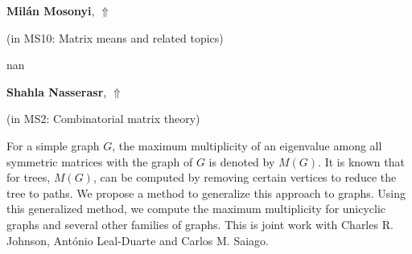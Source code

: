 \documentclass[ILAS2025-program.tex]{subfiles}
\begin{document}
\hypertarget{down0253}{}\begin{ilasabstract}
    
\textbf{Milán Mosonyi},  \hfill \hyperlink{up0253}{$\Uparrow$}
    
    
(in {\color{mstitle}MS10: Matrix means and related topics})
        
\mtskip
    nan
\end{ilasabstract}
    

\hypertarget{down0262}{}\begin{ilasabstract}
    
\textbf{Shahla Nasserasr},  \hfill \hyperlink{up0262}{$\Uparrow$}
    
    
(in {\color{mstitle}MS2: Combinatorial matrix theory})
        
\mtskip
    For a simple graph $G$, the maximum multiplicity of an eigenvalue among all symmetric matrices with the graph of $G$ is denoted by $M(G)$. It is known that for trees, $M(G)$, can be computed by removing certain vertices to reduce the tree to paths. We propose a method to generalize this approach to graphs. Using this generalized method, we compute the maximum multiplicity for unicyclic graphs and several other families of graphs.
This is joint work with Charles R. Johnson, Ant\'onio Leal-Duarte and Carlos M. Saiago.

\end{ilasabstract}
    
\end{document}

